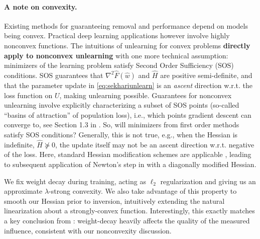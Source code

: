 \paragraph{A note on convexity.}
Existing methods for guaranteeing removal and performance depend on models being convex. Practical deep learning applications however involve highly nonconvex functions.
The intuitions of unlearning for convex problems \textbf{directly apply to nonconvex unlearning} with one more technical assumption: minimizers of the learning problem satisfy Second Order Sufficiency (SOS) conditions. 
SOS guarantees that $ \nabla^2\hat{F}(\hat{w})$ and $\hat{H}$ are positive semi-definite, and that the parameter update in \eqref{eq:sekhariunlearn} is an \textit{ascent} direction w.r.t. the loss function on $U$, making unlearning possible. Guarantees for nonconvex unlearning involve explicitly characterizing a subset of SOS points (so-called  ``basins of attraction'' of population loss), i.e., which points gradient descent can converge to, see Section 1.3 in \cite{Traonmilin_2020}. 
%
So, will minimizers from first order methods satisfy SOS conditions? Generally, this is not true, e.g., when the Hessian is indefinite, $\hat{H}\not\succeq 0$, the update itself may not be an ascent direction w.r.t. negative of the loss. Here, standard Hessian modification schemes are applicable \cite{wright1999numerical}, leading to subsequent application of Newton's step in \cite{sekhari2021remember} with a diagonally modified Hessian.


We fix weight decay during training, acting as $\ell_2$ regularization and giving us an approximate $\lambda$-strong convexity. We also take advantage of this property to smooth our Hessian prior to inversion, intuitively extending the natural linearization about a strongly-convex function. Interestingly, this exactly matches a key conclusion from \cite{basu2021influence}: weight-decay heavily affects the quality of 
the measured influence,  
consistent with our nonconvexity discussion.

